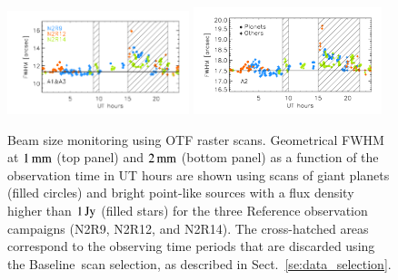\documentclass[traditionalabstract]{aa}
\newcommand{\baseline}{Baseline}%
\begin{document}
{\begin{figure}[ht!]
  \begin{center}
    \includegraphics[clip=true, trim={0.9cm, 0.5cm, 0.5cm, 0.5cm}, width=0.4725\textwidth]{Figures/Beam_monitoring_with_otfs_vs_ut_1mm.pdf}
    \includegraphics[clip=true, trim={0.5cm, 0.5cm, 0.5cm, 0.5cm}, width=0.4875\textwidth]{Figures/Beam_monitoring_with_otfs_vs_ut_a2.pdf}
    \caption[Beam size monitoring using OTF scans]{Beam size
      monitoring using OTF raster scans. Geometrical FWHM at $1\,\rm{mm}$ (top panel)
      and $2\,\rm{mm}$ (bottom panel) as a function of the
      observation time in UT hours are shown using scans of giant
      planets (filled circles) and bright point-like sources with a
      flux density higher than $1\,\rm{Jy}$ (filled stars) for the three Reference
      observation campaigns (N2R9, N2R12, and N2R14). The cross-hatched areas
      correspond to the observing time periods that are discarded using
      the \baseline\ scan selection, as described in Sect.~\ref{se:data_selection}.} 
\label{fig:beam_monitoring_otf}
  \end{center}
\end{figure}

}
\end{document}
